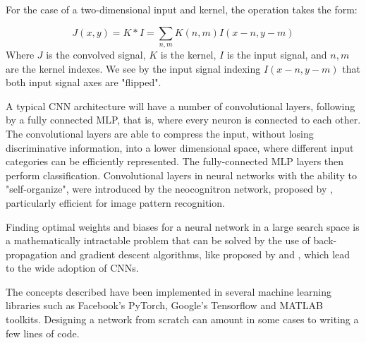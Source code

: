 For the case of a two-dimensional input and kernel, the operation takes the form:

\begin{equation}
J(x,y) = K * I = \sum_{n,m}K(n,m)I(x-n,y-m) 
\end{equation}
Where $J$ is the convolved signal, $K$ is the kernel, $I$ is the input signal, and $n,m$ are the kernel indexes. We see by the input signal indexing $I(x-n,y-m)$ that both input signal axes are "flipped".

A typical CNN architecture will have a number of convolutional layers, following by a fully connected MLP, that is, where every neuron is connected to each other. The convolutional layers are able to compress the input, without losing discriminative information, into a lower dimensional space, where different input categories can be efficiently represented.
The fully-connected MLP layers then perform classification. Convolutional layers in neural networks with the ability to "self-organize", were introduced by the neocognitron network, proposed by \cite{fukushima:neocognitronbc}, particularly efficient for image pattern recognition.

Finding optimal weights and biases for a neural network in a large search space is a mathematically intractable problem that can be solved by the use of back-propagation and gradient descent algorithms, like proposed by \cite{Rumelhart:1986we} and \cite{Lecun98gradient-basedlearning}, which lead to the wide adoption of CNNs.

The concepts described have been implemented in several machine learning libraries such as Facebook's PyTorch, Google's Tensorflow and MATLAB toolkits. Designing a network from scratch can amount in some cases to writing a few lines of code.  

